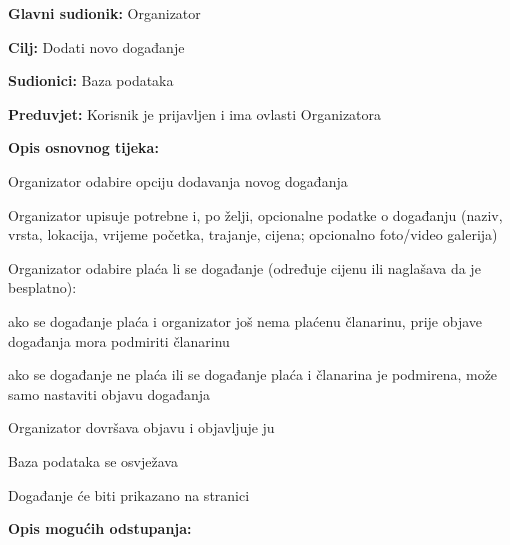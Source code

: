 					\noindent {}
					\begin{packed_item}
						
						\item \textbf{Glavni sudionik: } Organizator
						\item  \textbf{Cilj:} Dodati novo događanje 
						\item  \textbf{Sudionici:} Baza podataka
						\item  \textbf{Preduvjet:} Korisnik je prijavljen i ima ovlasti Organizatora
						\item  \textbf{Opis osnovnog tijeka:}
						
						\item[] \begin{packed_enum}
							
							\item Organizator odabire opciju dodavanja novog događanja
							\item Organizator upisuje potrebne i, po želji, opcionalne podatke o događanju (naziv, vrsta, lokacija, vrijeme početka, trajanje, cijena; opcionalno foto/video galerija)
							\item Organizator odabire plaća li se događanje (određuje cijenu ili naglašava da je besplatno):
							
							\item[] \begin{packed_enum}
								
								\item ako se događanje plaća i organizator još nema plaćenu članarinu, prije objave događanja mora podmiriti članarinu 
								\item ako se događanje ne plaća ili se događanje plaća i članarina je podmirena, može samo nastaviti objavu događanja
								
							\end{packed_enum}
							
							\item Organizator dovršava objavu i objavljuje ju
							\item Baza podataka se osvježava
							\item Događanje će biti prikazano na stranici
							
							\end{packed_enum}
							
							\item  \textbf{Opis mogućih odstupanja:}
							

\end{packed_item}
